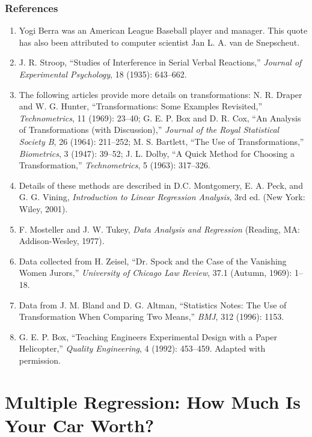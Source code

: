 \documentclass[
]{report}
\begin{document}
\hypertarget{references-1}{%
\subsection*{References}\label{references-1}}

\begin{enumerate}
  \item Yogi Berra was an American League Baseball player and manager. This quote has also been attributed to computer scientist Jan L. A. van de Snepscheut.
  \item J. R. Stroop, “Studies of Interference in Serial Verbal Reactions,” \textit{Journal of Experimental Psychology}, 18 (1935): 643–662.
  \item The following articles provide more details on transformations: N. R. Draper and W. G. Hunter, “Transformations: Some Examples Revisited,” \textit{Technometrics}, 11 (1969): 23–40; G. E. P. Box and D. R. Cox, “An Analysis of Transformations (with Discussion),” \textit{Journal of the Royal Statistical Society B}, 26 (1964): 211–252; M. S. Bartlett, “The Use of Transformations,” \textit{Biometrics}, 3 (1947): 39–52; J. L. Dolby, “A Quick Method for Choosing a Transformation,” \textit{Technometrics}, 5 (1963): 317–326.
  \item Details of these methods are described in D.C. Montgomery, E. A. Peck, and G. G. Vining, \textit{Introduction to Linear Regression Analysis}, 3rd ed. (New York: Wiley, 2001).
  \item F. Mosteller and J. W. Tukey, \textit{Data Analysis and Regression} (Reading, MA: Addison-Wesley, 1977).
  \item Data collected from H. Zeisel, “Dr. Spock and the Case of the Vanishing Women Jurors,” \textit{University of Chicago Law Review}, 37.1 (Autumn, 1969): 1–18.
  \item Data from J. M. Bland and D. G. Altman, “Statistics Notes: The Use of Transformation When Comparing Two Means,” \textit{BMJ}, 312 (1996): 1153.
  \item G. E. P. Box, “Teaching Engineers Experimental Design with a Paper Helicopter,” \textit{Quality Engineering}, 4 (1992): 453–459. Adapted with permission.
\end{enumerate}

\hypertarget{multiple-regression-how-much-is-your-car-worth}{%
\chapter{Multiple Regression: How Much Is Your Car Worth?}\label{multiple-regression-how-much-is-your-car-worth}}
\end{document}
